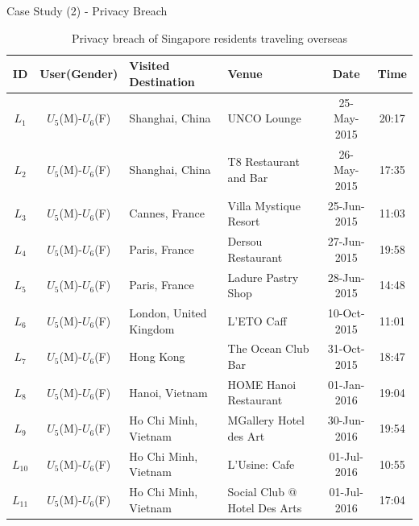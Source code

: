 \begin{slide}[toc=,bm=]{Case Study (2) - Privacy Breach}
\begin{table}
	\fontsize{11pt}{11pt}\selectfont
	\setlength{\abovecaptionskip}{0pt}
	\setlength{\belowcaptionskip}{12pt}
	\centering
	\caption{Privacy breach of Singapore residents traveling overseas}
	\begin{tabular}{c|c|l|l|c|c}	
	\toprule
	ID  	&  	\textbf{User(Gender)}		& 		\textbf{Visited Destination} 		& 		\textbf{Venue} 		& 	\textbf{Date} 		&	\textbf{Time}	\\
	\midrule
	$L_1$	&	$U_5$(M)-$U_6$(F)	&	Shanghai, China 	   &	UNCO Lounge		&	25-May-2015	&	20:17\\
	$L_2$	&	$U_5$(M)-$U_6$(F)	&	Shanghai, China 	   &	T8 Restaurant and Bar		&	26-May-2015	&	17:35\\
	$L_3$	&	$U_5$(M)-$U_6$(F)	&	Cannes, France 	       &	Villa Mystique Resort		&	25-Jun-2015	&	11:03\\	
	$L_4$	&	$U_5$(M)-$U_6$(F)	&	Paris, France 		   &	Dersou Restaurant			&	27-Jun-2015	&	19:58\\
	$L_5$	&	$U_5$(M)-$U_6$(F)	&	Paris, France 		   &	Ladure Pastry Shop			&	28-Jun-2015	&	14:48\\
	$L_6$	&	$U_5$(M)-$U_6$(F)	&	London, United Kingdom &	L'ETO Caff			&	10-Oct-2015	&	11:01\\
	$L_7$	&	$U_5$(M)-$U_6$(F)	&	Hong Kong		       &	The Ocean Club Bar			&	31-Oct-2015	&	18:47\\
	$L_8$	&	$U_5$(M)-$U_6$(F)	&	Hanoi, Vietnam		   &	HOME Hanoi Restaurant			&	01-Jan-2016	&	19:04\\
	$L_9$	&	$U_5$(M)-$U_6$(F)	&	Ho Chi Minh, Vietnam   &	MGallery Hotel des Art		&	30-Jun-2016	&	19:54\\
	$L_{10}$	&	$U_5$(M)-$U_6$(F)	&	Ho Chi Minh, Vietnam   &	L'Usine: Cafe		&	01-Jul-2016	&	10:55\\
	$L_{11}$	&	$U_5$(M)-$U_6$(F)	&	Ho Chi Minh, Vietnam   &	Social Club @ Hotel Des Arts		&	01-Jul-2016	&	17:04\\
	\bottomrule
	\end{tabular}	
\end{table}


\end{slide}



